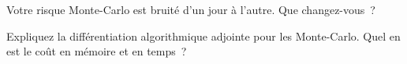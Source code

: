 \begin{interviewq}\label{iq:dv:monte-carlo-pricers-in-practice:5}
Votre risque Monte-Carlo est bruité d'un jour à l'autre. Que changez-vous~?
\end{interviewq}

\begin{interviewq}\label{iq:dv:monte-carlo-pricers-in-practice:6}
Expliquez la différentiation algorithmique adjointe pour les  Monte-Carlo. Quel en est le coût en mémoire et en temps~?
\end{interviewq}
